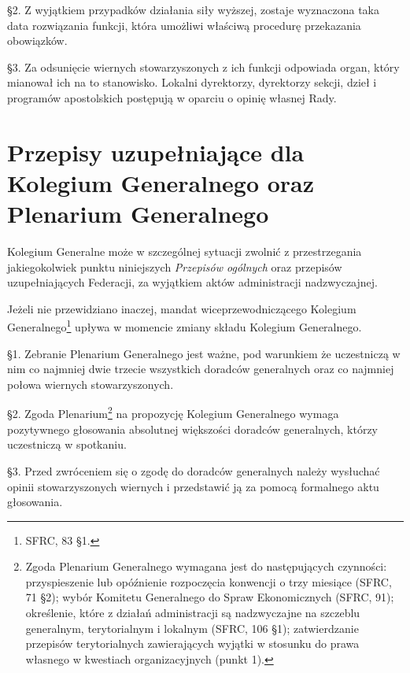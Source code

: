 \S{}2. Z wyjątkiem przypadków działania siły wyższej, zostaje wyznaczona taka data rozwiązania funkcji, która umożliwi właściwą procedurę przekazania obowiązków.

\S{}3. Za odsunięcie wiernych stowarzyszonych z ich funkcji odpowiada organ, który mianował ich na to stanowisko. Lokalni dyrektorzy, dyrektorzy sekcji, dzieł i programów apostolskich postępują w oparciu o opinię własnej Rady.

%
\chapter{Przepisy uzupełniające dla Kolegium Generalnego oraz Plenarium Generalnego}


 Kolegium Generalne może w szczególnej sytuacji zwolnić z przestrzegania jakiegokolwiek punktu niniejszych {\em Przepisów ogólnych} oraz przepisów uzupełniających Federacji, za wyjątkiem aktów administracji nadzwyczajnej.


 Jeżeli nie przewidziano inaczej, mandat wiceprzewodniczącego Kolegium Generalnego\footnote{SFRC, 83 \S{}1.} upływa w momencie zmiany składu Kolegium Generalnego.


\S{}1. Zebranie Plenarium Generalnego jest ważne, pod warunkiem że uczestniczą w nim co najmniej dwie trzecie wszystkich doradców generalnych oraz co najmniej połowa wiernych stowarzyszonych.

\S{}2. Zgoda Plenarium\footnote{Zgoda Plenarium Generalnego wymagana jest do następujących czynności: przyspieszenie lub opóźnienie rozpoczęcia konwencji o trzy miesiące (SFRC, 71 \S{}2); wybór Komitetu Generalnego do Spraw Ekonomicznych (SFRC, 91); określenie, które z działań administracji są nadzwyczajne na szczeblu generalnym, terytorialnym i lokalnym (SFRC, 106 \S{}1); zatwierdzanie przepisów terytorialnych zawierających wyjątki w stosunku do prawa własnego w kwestiach organizacyjnych (punkt 1).} na propozycję Kolegium Generalnego wymaga pozytywnego głosowania absolutnej większości doradców generalnych, którzy uczestniczą w spotkaniu.

\S{}3. Przed zwróceniem się o zgodę do doradców generalnych należy wysłuchać opinii stowarzyszonych wiernych i przedstawić ją za pomocą formalnego aktu głosowania.

